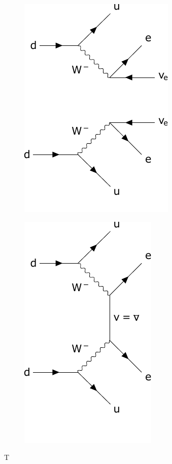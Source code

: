 \begin{figure}[tbph]
\centering
\begin{subfigure}[t]{0.49\textwidth}
\includegraphics[width=0.5\linewidth]{Figures/2NuBB_clip.pdf}
\label{fig:2nuBB}
\end{subfigure}
\begin{subfigure}[t]{0.49\textwidth}
\includegraphics[width=0.5\linewidth]{Figures/0NuBB_clip.pdf}
\end{subfigure}
\caption[Short Caption]{T}

\end{figure}

